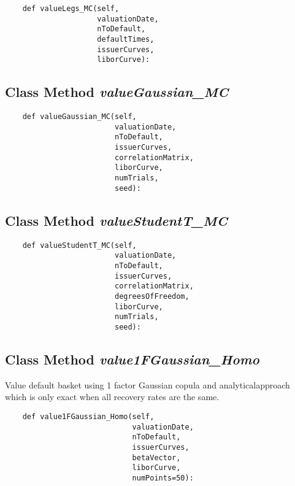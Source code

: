 \documentclass[twoside,11pt]{book}
\begin{document}
\begin{lstlisting}
    def valueLegs_MC(self,
                     valuationDate,
                     nToDefault,
                     defaultTimes,
                     issuerCurves,
                     liborCurve):
\end{lstlisting}

\subsection{Class Method {\it valueGaussian\_MC}}


\begin{lstlisting}
    def valueGaussian_MC(self,
                         valuationDate,
                         nToDefault,
                         issuerCurves,
                         correlationMatrix,
                         liborCurve,
                         numTrials,
                         seed):
\end{lstlisting}

\subsection{Class Method {\it valueStudentT\_MC}}


\begin{lstlisting}
    def valueStudentT_MC(self,
                         valuationDate,
                         nToDefault,
                         issuerCurves,
                         correlationMatrix,
                         degreesOfFreedom,
                         liborCurve,
                         numTrials,
                         seed):
\end{lstlisting}

\subsection{Class Method {\it value1FGaussian\_Homo}}
Value default basket using 1 factor Gaussian copula and analyticalapproach which is only exact when all recovery rates are the same. 

\begin{lstlisting}
    def value1FGaussian_Homo(self,
                             valuationDate,
                             nToDefault,
                             issuerCurves,
                             betaVector,
                             liborCurve,
                             numPoints=50):
\end{lstlisting}
\end{document}
